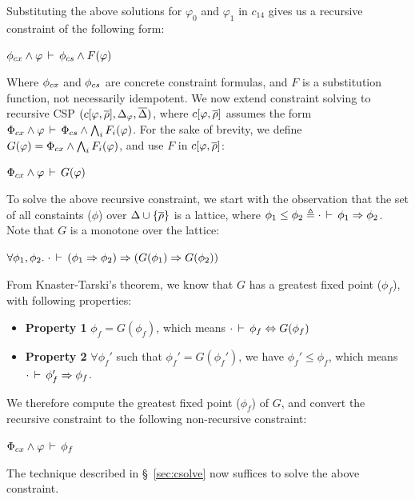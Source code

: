 Substituting the above solutions for $\varphi_0$ and $\varphi_1$ in
$c_{14}$ gives us a recursive constraint of the following form:
\begin{center}
\(
  \phi_{cx} \wedge \varphi\,\vdash\,\phi_{cs} \wedge F(\varphi)
\)
\end{center}
Where $\phi_{cx}$ and $\phi_{cs}$ are concrete constraint formulas, and
$F$ is a substitution function, not necessarily idempotent. We now
extend constraint solving to recursive CSP $(c\lbrack \varphi,\overline{\rho} \rbrack,\Delta_{\varphi},\overline{\Delta})$, where $c\lbrack
\varphi,\overline{\rho} \rbrack$ assumes the form $\Phi_{cx} \wedge
\varphi\,\vdash\,\Phi_{cs} \wedge \bigwedge_i F_i(\varphi)$. For the sake of
brevity, we define $G(\varphi) = \Phi_{cx} \wedge \bigwedge_i
F_i(\varphi)$, and use $F$ in $c\lbrack \varphi,\overline{\rho} \rbrack$: 
\begin{center}
\(
  \Phi_{cx} \wedge \varphi\,\vdash\,G(\varphi)
\)
\end{center}
To solve the above recursive constraint, we start with the observation
that the set of all constaints ($\phi$) over $\Delta \cup
\{\overline{\rho}\}$ is a lattice, where $\phi_1 \le \phi_2 \triangleq
\cdot\,\vdash\,\phi_1 \Rightarrow \phi_2$. Note that $G$ is a
monotone over the lattice:
\begin{center}
  $\forall \phi_1,\phi_2.\; \cdot\,\vdash\,(\phi_1 \Rightarrow
  \phi_2) \Rightarrow (G(\phi_1) \Rightarrow G(\phi_2))$
\end{center}
From Knaster-Tarski's theorem, we know that $G$ has a greatest fixed
point ($\phi_f$), with following properties:
\begin{itemize}
\item \textbf{Property 1} $\phi_f = G(\phi_f)$, which means
$\cdot\,\vdash\,\phi_f \Leftrightarrow G(\phi_f)$
\item \textbf{Property 2} $\forall \phi_f'$ such that $\phi_f' =
G(\phi_f')$, we have $\phi_f' \le \phi_f$, which means $\cdot\,\vdash\,\phi_f' \Rightarrow \phi_f$.
\end{itemize}
We therefore compute the greatest fixed point ($\phi_f$) of $G$, and
convert the recursive constraint to the following non-recursive
constraint:
\begin{center}
\(
  \Phi_{cx} \wedge \varphi\,\vdash\,\phi_f
\)
\end{center}
The technique described in \S~\ref{sec:csolve} now suffices to solve
the above constraint.

